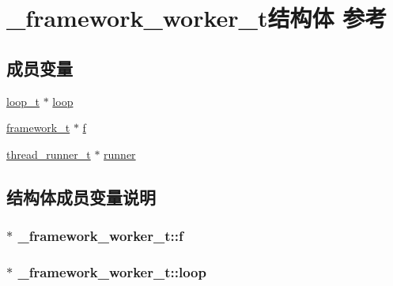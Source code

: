 \hypertarget{a00014}{}\section{\+\_\+framework\+\_\+worker\+\_\+t结构体 参考}
\label{a00014}
\subsection*{成员变量}
\begin{DoxyCompactItemize}
\item 
\hyperlink{a00050_a9c3ad1cd2de83e09f3a7b59fa82c94ee_a9c3ad1cd2de83e09f3a7b59fa82c94ee}{loop\+\_\+t} $\ast$ \hyperlink{a00014_ab4522a69094d41136b14e382ef3fcb8a_ab4522a69094d41136b14e382ef3fcb8a}{loop}
\item 
\hyperlink{a00050_a6149d769f6f07ed14a40a271c95d8463_a6149d769f6f07ed14a40a271c95d8463}{framework\+\_\+t} $\ast$ \hyperlink{a00014_a807e1f788cb43947cfe5c14c95b8cd22_a807e1f788cb43947cfe5c14c95b8cd22}{f}
\item 
\hyperlink{a00050_a9054159cde2f926ef61c28ce1e555199_a9054159cde2f926ef61c28ce1e555199}{thread\+\_\+runner\+\_\+t} $\ast$ \hyperlink{a00014_a815b2ce0f2ea29ae265bb7dc2e804165_a815b2ce0f2ea29ae265bb7dc2e804165}{runner}
\end{DoxyCompactItemize}


\subsection{结构体成员变量说明}
\hypertarget{a00014_a807e1f788cb43947cfe5c14c95b8cd22_a807e1f788cb43947cfe5c14c95b8cd22}{}
\subsubsection[{f}]{$\ast$ \+\_\+framework\+\_\+worker\+\_\+t\+::f}\label{a00014_a807e1f788cb43947cfe5c14c95b8cd22_a807e1f788cb43947cfe5c14c95b8cd22}
\hypertarget{a00014_ab4522a69094d41136b14e382ef3fcb8a_ab4522a69094d41136b14e382ef3fcb8a}{}
\subsubsection[{loop}]{$\ast$ \+\_\+framework\+\_\+worker\+\_\+t\+::loop}\label{a00014_ab4522a69094d41136b14e382ef3fcb8a_ab4522a69094d41136b14e382ef3fcb8a}
\hypertarget{a00014_a815b2ce0f2ea29ae265bb7dc2e804165_a815b2ce0f2ea29ae265bb7dc2e804165}{}
